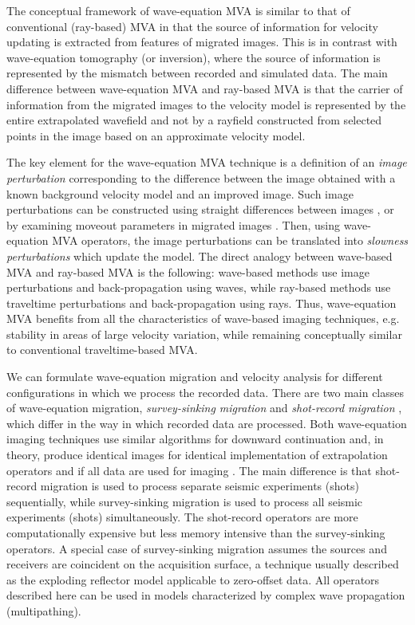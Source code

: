 The conceptual framework of wave-equation MVA is similar to that of
conventional (ray-based) MVA in that the source of information for
velocity updating is extracted from features of migrated images. This
is in contrast with wave-equation tomography (or inversion), where the
source of information is represented by the mismatch between recorded
and simulated data. The main difference between wave-equation MVA and
ray-based MVA is that the carrier of information from the migrated
images to the velocity model is represented by the entire extrapolated
wavefield and not by a rayfield constructed from selected points in
the image based on an approximate velocity model.

The key element for the wave-equation MVA technique is a definition of
an {\it image perturbation} corresponding to the difference between
the image obtained with a known background velocity model and an
improved image. Such image perturbations can be constructed using
straight differences between images
\cite[]{BiondiSava.segab.1999,Albertin4D}, or by examining moveout
parameters in migrated images
\cite[]{SavaBiondi.gp.wemva1,SavaBiondi.gp.wemva2,ShenSymes.segab.2005,Albertin.eageab.2006,MaharramovAlbertin.segab.2007}. Then, using wave-equation MVA
operators, the image perturbations can be translated into {\it
slowness perturbations} which update the model. The direct analogy
between wave-based MVA and ray-based MVA is the following: wave-based
methods use image perturbations and back-propagation using waves,
while ray-based methods use traveltime perturbations and
back-propagation using rays. Thus, wave-equation MVA benefits from all
the characteristics of wave-based imaging techniques, e.g. stability
in areas of large velocity variation, while remaining conceptually
similar to conventional traveltime-based MVA.


We can formulate wave-equation migration and velocity analysis for
different configurations in which we process the recorded data. There
are two main classes of wave-equation migration, {\it survey-sinking
migration} and {\it shot-record migration} \cite[]{Claerbout.iei},
which differ in the way in which recorded data are processed. Both
wave-equation imaging techniques use similar algorithms for downward
continuation and, in theory, produce identical images for identical
implementation of extrapolation operators and if all data are used for
imaging \cite[]{Berkhout.1982,GEO68-04-13401347}. The main difference
is that shot-record migration is used to process separate seismic
experiments (shots) sequentially, while survey-sinking migration is
used to process all seismic experiments (shots)
simultaneously. The shot-record operators are more
computationally expensive but less memory intensive than the
survey-sinking operators. A special case of survey-sinking migration
assumes the sources and receivers are coincident on the acquisition
surface, a technique usually described as the exploding reflector
model \cite[]{GPR24-02-03800399} applicable to zero-offset
data. All operators described here can be used in models
characterized by complex wave propagation (multipathing).


